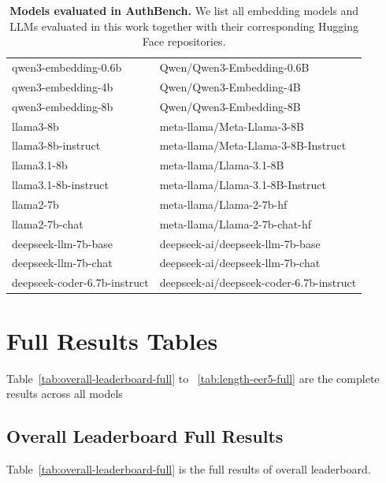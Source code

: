 \documentclass[11pt]{article}
\begin{document}
\begin{table}[h!]
{\begin{tabular}{ll}
qwen3-embedding-0.6b & Qwen/Qwen3-Embedding-0.6B \\
qwen3-embedding-4b & Qwen/Qwen3-Embedding-4B \\
qwen3-embedding-8b & Qwen/Qwen3-Embedding-8B \\
llama3-8b & meta-llama/Meta-Llama-3-8B \\
llama3-8b-instruct & meta-llama/Meta-Llama-3-8B-Instruct \\
llama3.1-8b & meta-llama/Llama-3.1-8B \\
llama3.1-8b-instruct & meta-llama/Llama-3.1-8B-Instruct \\
llama2-7b & meta-llama/Llama-2-7b-hf \\
llama2-7b-chat & meta-llama/Llama-2-7b-chat-hf \\
deepseek-llm-7b-base & deepseek-ai/deepseek-llm-7b-base \\
deepseek-llm-7b-chat & deepseek-ai/deepseek-llm-7b-chat \\
deepseek-coder-6.7b-instruct & deepseek-ai/deepseek-coder-6.7b-instruct \\
\bottomrule
\end{tabular}
}
\caption{\textbf{Models evaluated in AuthBench.}
We list all embedding models and LLMs evaluated in this work together with their
corresponding Hugging Face repositories.}
\label{tab:models-evaluated}
\end{table}


\section{Full Results Tables}
\label{sec:appendix-full-results}
Table~\ref{tab:overall-leaderboard-full} to ~\ref{tab:length-eer5-full} are the complete results across all models
%  

\subsection{Overall Leaderboard Full Results}
Table~\ref{tab:overall-leaderboard-full} is the full results of overall leaderboard.
\end{document}
